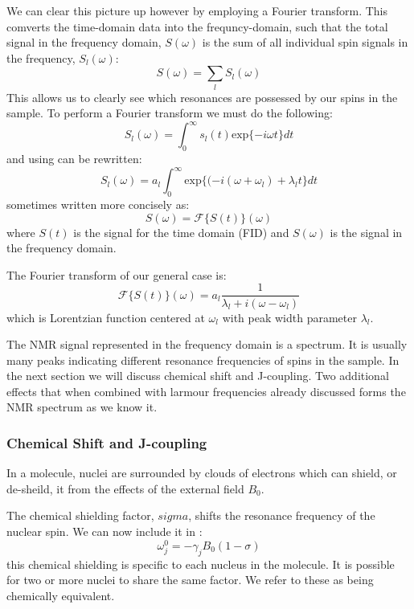 We can clear this picture up however by employing a Fourier transform. This comverts the time-domain data
into the frequncy-domain, such that the total signal in the frequency domain, $S(\omega)$ is the sum of all individual spin signals in the frequency, $S_l(\omega)$:
\begin{equation}
  S(\omega) = \sum_l S_l(\omega)
\end{equation}
This allows us to clearly see which resonances are possessed by our spins in the sample. To
perform a Fourier transform we must do the following:
\begin{equation}
  S_l(\omega) = \int_{0}^{\infty}s_l(t)\text{exp}\{-i\omega t\}dt
\end{equation}
and using  can be rewritten:
\begin{equation}
  S_l(\omega) = a_l\int_{0}^{\infty}\text{exp}\{(-i(\omega+\omega_l)+\lambda_l t\}dt
\end{equation}
sometimes written more concisely as:
\begin{equation}
  S(\omega) = \mathcal{F}\{S(t)\}(\omega)
\end{equation}
where $S(t)$ is the signal for the time domain (FID) and $S(\omega)$ is the signal in the frequency domain.

The Fourier transform of our general case is:
\begin{equation}
  \mathcal{F}\{S(t)\}(\omega) = a_l\frac{1}{\lambda_l + i(\omega - \omega_l)}
\end{equation}
which is Lorentzian function centered at $\omega_l$ with peak width parameter $\lambda_l$.

The NMR signal represented in the frequency domain is a spectrum. It is usually many peaks
indicating different resonance frequencies of spins in the sample. In the next
section we will discuss chemical shift and J-coupling. Two additional effects that when combined
with larmour frequencies already discussed forms the NMR spectrum as we know it.

\subsubsection{Chemical Shift and J-coupling}

In a molecule, nuclei are surrounded by clouds of electrons which can shield, or de-sheild, it
from the effects of the external field $B_0$.

The chemical shielding factor, $sigma$, shifts the resonance frequency of the nuclear spin. We
can now include it in :
\begin{equation}
  \omega_j^0 = -\gamma_jB_0(1-\sigma)
\end{equation}
this chemical shielding is specific to each nucleus in the molecule. It is possible
for two or more nuclei to share the same factor. We refer to these as being chemically equivalent.

